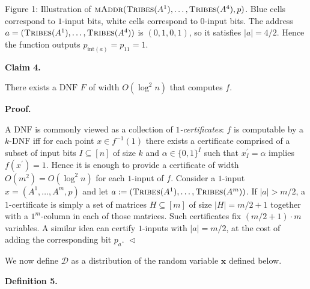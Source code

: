 Figure 1: Illustration of $\textsc{mAddr}(\textsc{Tribes}(A^{1}),\dots,\textsc{Tribes}(A^{4}),p)$. Blue cells correspond to $1$-input bits, white cells correspond to $0$-input bits. The
address $a=(\textsc{Tribes}(A^{1}),\dots,\textsc{Tribes}(A^{4}))$ is $(0,1,0,1)$, so it satisfies $|a|=4/2$. Hence the function outputs $p_{\text{int}(a)}=p_{11}=1$.




\par\medskip\noindent\textbf{
Claim 4. 
}\par



There exists a $\mathrm{DNF}$ $F$ of width $O(\log^{2}n)$ that computes $f$.\par






\par\medskip\noindent\textbf{
\textbf{Proof}.}\par




A $\mathrm{DNF}$ is commonly viewed as a collection of \emph{$1$-certificates}: $f$ is computable by a $k$-$\mathrm{DNF}$ iff for each point $x\in f^{-1}(1)$ there exists a certificate comprised of a subset of input bits $I\subseteq[n]$ of size $k$ and $\alpha\in\{0,1\}^{I}$ such that $x^{\prime}_{I}=\alpha$ implies $f(x^{\prime})=1$. Hence it is enough to provide a certificate of width $O(m^{2})=O(\log^{2}n)$ for each $1$-input of $f$. Consider a $1$-input $x=(A^{1},\dots,A^{m},p)$ and let $a:=(\textsc{Tribes}(A^{1}),\dots,\textsc{Tribes}(A^{m}))$. If $|a|>m/2$, a $1$-certificate is simply a set of matrices $H\subseteq[m]$ of size $|H|=m/2+1$ together with a $1^{m}$-column in each of those matrices. Such certificates fix $(m/2+1)\cdot m$ variables. A similar idea can certify $1$-inputs with $|a|=m/2$, at the cost of adding the corresponding bit $p_{a}$.
$\vartriangleleft$\par




We now define $\mathcal{D}$ as a distribution of the random variable $\bm{x}$ defined below.\par





\par\medskip\noindent\textbf{
\textbf{Definition 5}\textbf{.}
}\par



